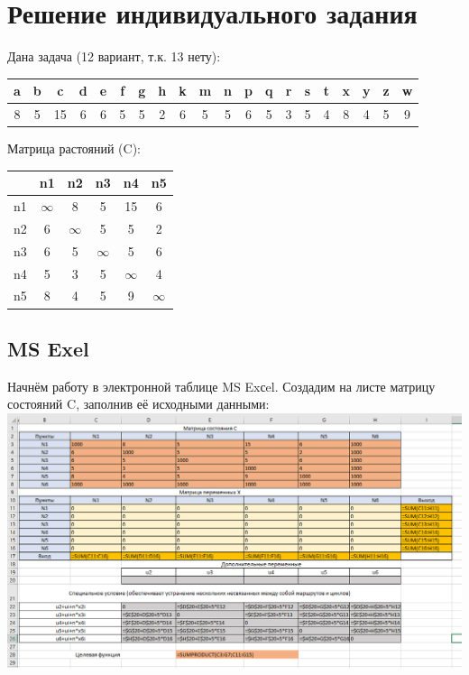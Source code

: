 \documentclass[a4paper, 12pt]{article}
\begin{document}
\section{Решение индивидуального задания}
Дана задача (12 вариант, т.к. 13 нету):
\begin{table}[H]
\centering
\begin{tabular}{|c|c|c|c|c|c|c|c|c|c|c|c|c|c|c|c|c|c|c|c|}
\hline
a & b & c & d & e & f & g & h & k & m & n & p & q & r & s & t & x & y & z & w \\ \hline
8 & 5 & 15& 6 & 6 & 5 & 5 & 2 & 6 & 5 & 5 & 6 & 5 & 3 & 5 & 4 & 8 & 4 & 5 & 9 \\ \hline
\end{tabular}
\end{table}

Матрица растояний (C):
\begin{table}[H]
\centering
\begin{tabular}{c|c|c|c|c|c|}
  &n1      &n2      &n3      &n4      &n5      \\ \hline
n1&$\infty$&8       &5       &15      &6       \\ \hline
n2&6       &$\infty$&5       &5       &2       \\ \hline
n3&6       &5       &$\infty$&5       &6       \\ \hline
n4&5       &3       &5       &$\infty$&4       \\ \hline
n5&8       &4       &5       &9       &$\infty$\\ \hline
\end{tabular}
\end{table}

\newpage
\subsection{MS Exel}
Начнём работу в электронной таблице MS Exсel. Создадим на листе матрицу состояний C, заполнив её исходными данными:\\

\includegraphics[width=\textwidth]{3-1.png}\\
\end{document}
